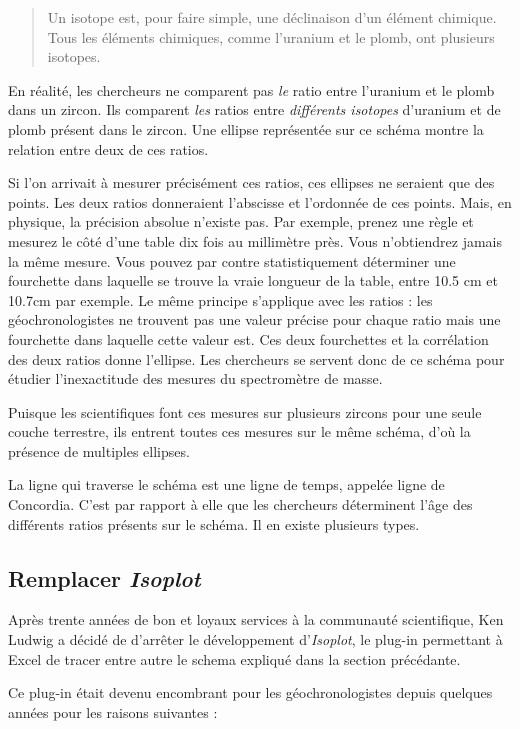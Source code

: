 \begin{quote}
Un isotope est, pour faire simple, une déclinaison d'un élément chimique. Tous les éléments chimiques, comme l'uranium et le plomb, ont plusieurs isotopes.
\end{quote}

En réalité, les chercheurs ne comparent pas \emph{le} ratio entre l'uranium et le plomb dans un zircon. Ils comparent \emph{les} ratios entre \emph{différents isotopes} d'uranium et de plomb présent dans le zircon.
Une ellipse représentée sur ce schéma montre la relation entre deux de ces ratios.

Si l'on arrivait à mesurer précisément ces ratios, ces ellipses ne seraient que des points. Les deux ratios donneraient l'abscisse et l'ordonnée de ces points. Mais, en physique, la précision absolue n'existe pas. Par exemple, prenez une règle et mesurez le côté d'une table dix fois au millimètre près. Vous n'obtiendrez jamais la même mesure. Vous pouvez par contre statistiquement déterminer une fourchette dans laquelle se trouve la vraie longueur de la table, entre 10.5 cm et 10.7cm par exemple. Le même principe s'applique avec les ratios : les géochronologistes ne trouvent pas une valeur précise pour chaque ratio mais une fourchette dans laquelle cette valeur est. Ces deux fourchettes et la corrélation des deux ratios donne l'ellipse. Les chercheurs se servent donc de ce schéma pour étudier l'inexactitude des mesures du spectromètre de masse.

Puisque les scientifiques font ces mesures sur plusieurs zircons pour une seule couche terrestre, ils entrent toutes ces mesures sur le même schéma, d'où la présence de multiples ellipses.

La ligne qui traverse le schéma est une ligne de temps, appelée ligne de Concordia. C'est par rapport à elle que les chercheurs déterminent l'âge des différents ratios présents sur le schéma. Il en existe plusieurs types.

\subsection{Remplacer \textit{Isoplot}}
Après trente années de bon et loyaux services à la communauté scientifique, Ken Ludwig a décidé de d'arrêter le développement d'\textit{Isoplot}, le plug-in permettant à Excel de tracer entre autre le schema expliqué dans la section précédante.

Ce plug-in était devenu encombrant pour les géochronologistes depuis quelques années pour les raisons suivantes :

